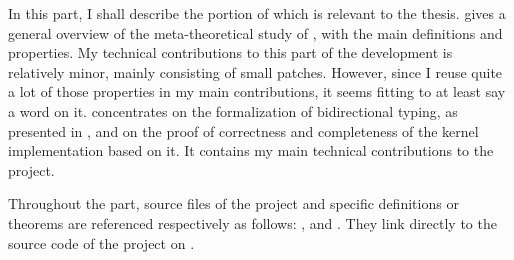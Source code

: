 In this part, I shall describe the portion of  which is relevant to the thesis.
 gives a general overview of the meta-theoretical study of ,
with the main definitions and properties.
My technical contributions to this part of the development is relatively minor,
mainly consisting of small patches. However, since I reuse quite a lot of those properties
in my main contributions, it seems fitting to at least say a word on it.
 concentrates on the formalization of bidirectional typing, as
presented in , and on the proof of correctness and completeness of
the kernel implementation based on it. It contains my main technical
contributions to the  project.

Throughout the part, source files of the  project
and specific definitions or theorems are referenced respectively as follows:
, and . They link directly to the source
code of the project on .